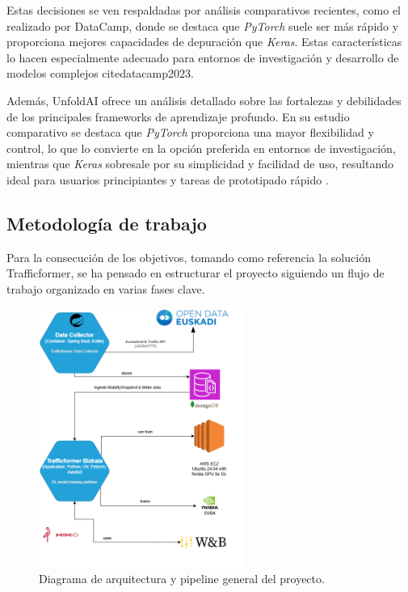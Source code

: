 Estas decisiones se ven respaldadas por análisis comparativos recientes, como el realizado por DataCamp, donde se destaca que \textit{PyTorch} suele ser más rápido y proporciona mejores capacidades de depuración que \textit{Keras}. Estas características lo hacen especialmente adecuado para entornos de investigación y desarrollo de modelos complejos cite{datacamp2023}.

Además, UnfoldAI ofrece un análisis detallado sobre las fortalezas y debilidades de los principales frameworks de aprendizaje profundo. En su estudio comparativo se destaca que \textit{PyTorch} proporciona una mayor flexibilidad y control, lo que lo convierte en la opción preferida en entornos de investigación, mientras que \textit{Keras} sobresale por su simplicidad y facilidad de uso, resultando ideal para usuarios principiantes y tareas de prototipado rápido \cite{unfoldai2024}.

\subsection{Metodología de trabajo}

Para la consecución de los objetivos, tomando como referencia la solución Trafficformer, se ha pensado en estructurar el proyecto siguiendo un flujo de trabajo organizado en varias fases clave.

\begin{figure}[H]
	\centering
	\includegraphics[width=0.6\textwidth]{includes/cap4/trafficformer_arch.png}
	\caption{Diagrama de arquitectura y pipeline general del proyecto.}
	\label{fig:pipeline-general}
\end{figure}


